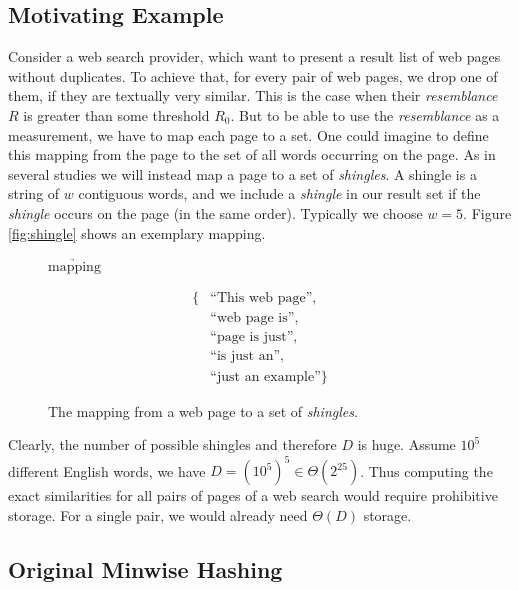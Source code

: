 \documentclass[a4paper]{article}
\begin{document}
\subsection{Motivating Example}
Consider a web search provider, which want to present a result list of web pages without duplicates. To achieve that, for every pair of web pages, we drop one of them, if they are textually very similar. This is the case when their \emph{resemblance} $R$ is greater than some threshold $R_0$. But to be able to use the \emph{resemblance} as a measurement, we have to map each page to a set. One could imagine to define this mapping from the page to the set of all words occurring on the page. As in several studies \citep{Broder:1998,BroderGMZ97} we will instead map a page to a set of \emph{shingles}. A shingle is a string of $w$ contiguous words, and we include a \emph{shingle} in our result set if the \emph{shingle} occurs on the page (in the same order). Typically we choose $w = 5$. Figure \vref{fig:shingle} shows an exemplary mapping.

\begin{figure}[h]
\begin{center}
\hspace{1cm} $\underrightarrow{\text{mapping}}$ \hspace{1cm}
\parbox{2cm}{
\begin{equation*}
\begin{split}
 \text{\{} & \text{``This web page''},\\ & \text{``web page is''},\\ & \text{``page is just''},\\ & \text{``is just an''},\\ & \text{``just an example''} \text{\}}
\end{split}
\end{equation*}
}
\end{center}
\caption{The mapping from a web page to a set of \emph{shingles}.}
\label{fig:shingle}
\end{figure}

Clearly, the number of possible shingles and therefore $D$ is huge. Assume $10^5$ different English words, we have $D=\left(10^5\right)^5 \in \Theta\left(2^{25}\right)$. Thus computing the exact similarities for all pairs of pages of a web search would require prohibitive storage. For a single pair, we would already need $\Theta(D)$ storage.

\subsection{Original Minwise Hashing}
\end{document}
